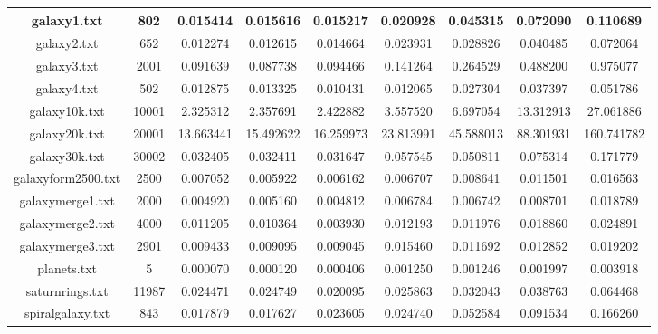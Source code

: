 \documentclass[letterpaper, 10 pt, conference]{ieeeconf}
\begin{document}
\begin{table}[h]
\begin{center}
\begin{tabular}{|c||c||c||c||c||c||c||c||c|}
                \hline
                galaxy1.txt        & 802   & 0.015414  & 0.015616  & 0.015217  & 0.020928  & 0.045315  & 0.072090   & 0.110689   \\
                \hline
                galaxy2.txt        & 652  & 0.012274  & 0.012615  & 0.014664  & 0.023931  & 0.028826  & 0.040485   & 0.072064   \\
                \hline
                galaxy3.txt        & 2001   & 0.091639  & 0.087738  & 0.094466  & 0.141264  & 0.264529  & 0.488200   & 0.975077   \\
                \hline
                galaxy4.txt      & 502 & 0.012875  & 0.013325  & 0.010431  & 0.012065  & 0.027304  & 0.037397  & 0.051786  \\
                \hline
                galaxy10k.txt      & 10001 & 2.325312 & 2.357691 & 2.422882 & 3.557520 & 6.697054 & 13.312913  & 27.061886 \\
                \hline
                galaxy20k.txt      & 20001 & 13.663441  & 15.492622  & 16.259973  & 23.813991  & 45.588013  & 88.301931   & 160.741782   \\
                \hline
                galaxy30k.txt & 30002  & 0.032405  & 0.032411  & 0.031647  & 0.057545  & 0.050811  & 0.075314   & 0.171779   \\
                \hline
                galaxyform2500.txt   & 2500  & 0.007052  & 0.005922  & 0.006162  & 0.006707  & 0.008641  & 0.011501   & 0.016563   \\
                \hline
                galaxymerge1.txt   & 2000  & 0.004920  & 0.005160  & 0.004812  & 0.006784  & 0.006742  & 0.008701   & 0.018789   \\
                \hline
                galaxymerge2.txt   & 4000  & 0.011205  & 0.010364  & 0.003930  & 0.012193  & 0.011976  & 0.018860   & 0.024891   \\
                \hline
                galaxymerge3.txt        & 2901     & 0.009433  & 0.009095  & 0.009045  & 0.015460  & 0.011692  & 0.012852   & 0.019202   \\
                \hline
                planets.txt    & 5 & 0.000070  & 0.000120  & 0.000406  & 0.001250  & 0.001246  & 0.001997   & 0.003918   \\
                \hline
                saturnrings.txt   & 11987   & 0.024471  & 0.024749  & 0.020095  & 0.025863  & 0.032043  & 0.038763   & 0.064468   \\
                \hline
                spiralgalaxy.txt   & 843   & 0.017879  & 0.017627  & 0.023605  & 0.024740  & 0.052584  & 0.091534   & 0.166260   \\
                \hline
            \end{tabular}
        \end{center}
    \end{table}
\end{document}
